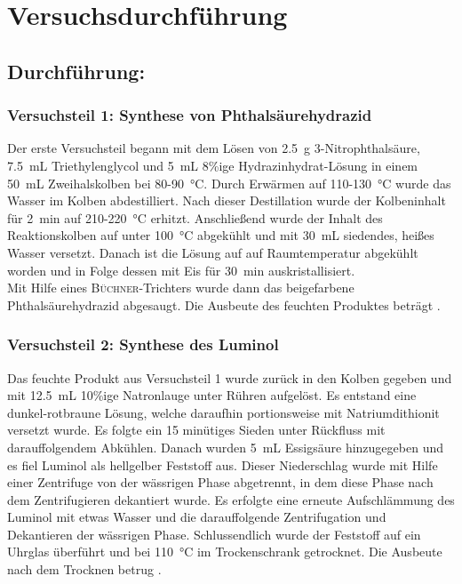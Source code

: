 \vfill
\section{Versuchsdurchführung}
\label{sec:durchfuerung}

\subsection*{Durchführung:}
\subsubsection*{Versuchsteil 1: Synthese von Phthalsäurehydrazid}
Der erste Versuchsteil begann mit dem Lösen von \SI{2,5}{\gram} 3-Nitrophthalsäure, \SI{7,5}{\milli \liter} Triethylenglycol und \SI{5}{\milli \liter} 8\%ige Hydrazinhydrat-Lösung in einem \SI{50}{\milli \liter} Zweihalskolben bei 80-\SI{90}{\celsius}. Durch Erwärmen auf 110-\SI{130}{\celsius} wurde das Wasser im Kolben abdestilliert. Nach dieser Destillation wurde der Kolbeninhalt für \SI{2}{\minute} auf 210-\SI{220}{\celsius} erhitzt. Anschließend wurde der Inhalt des Reaktionskolben auf unter \SI{100}{\celsius} abgekühlt und mit \SI{30}{\milli \liter} siedendes, heißes Wasser versetzt. Danach ist die Lösung auf auf Raumtemperatur abgekühlt worden und in Folge dessen mit Eis für \SI{30}{\minute} auskristallisiert.\\
Mit Hilfe eines \textsc{Büchner}-Trichters wurde dann das beigefarbene Phthalsäurehydrazid abgesaugt. Die Ausbeute des feuchten Produktes beträgt .

\vfill

\subsubsection*{Versuchsteil 2: Synthese des Luminol}
Das feuchte Produkt aus Versuchsteil 1 wurde zurück in den Kolben gegeben und mit \SI{12,5}{\milli \liter} 10\%ige Natronlauge unter Rühren aufgelöst. Es entstand eine dunkel-rotbraune Lösung, welche daraufhin portionsweise mit  Natriumdithionit versetzt wurde. Es folgte ein 15 minütiges Sieden unter Rückfluss mit darauffolgendem Abkühlen. Danach wurden \SI{5}{\milli \liter} Essigsäure hinzugegeben und es fiel Luminol als hellgelber Feststoff aus. Dieser Niederschlag wurde mit Hilfe einer Zentrifuge von der wässrigen Phase abgetrennt, in dem diese Phase nach dem Zentrifugieren dekantiert wurde. Es erfolgte eine erneute Aufschlämmung des Luminol mit etwas Wasser und die darauffolgende Zentrifugation und Dekantieren der wässrigen Phase. Schlussendlich wurde der Feststoff auf ein Uhrglas überführt und bei \SI{110}{\celsius} im Trockenschrank getrocknet. Die Ausbeute nach dem Trocknen betrug .

